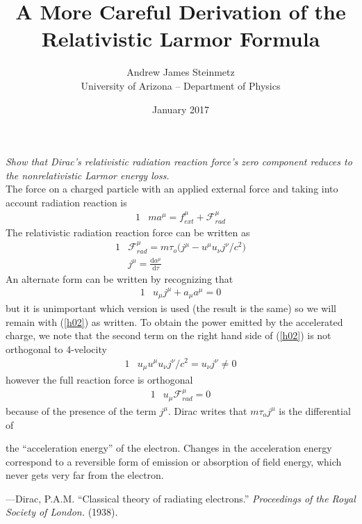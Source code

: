 \documentclass[]{article}
\numberwithin{equation}{subsection}
\begin{document}
\linespread{0.75}

\title{A More Careful Derivation of the Relativistic Larmor Formula}
\author{Andrew James Steinmetz\\ University of Arizona -- Department of Physics}
\date{January 2017}
\maketitle
\noindent \emph{Show that Dirac's relativistic radiation reaction force's zero component reduces to the nonrelativistic Larmor energy loss.}\\

\noindent The force on a charged particle with an applied external force and taking into account radiation reaction is
	\begin{alignat}{1}
	\label{h01}		&ma^{\mu}=f^{\mu}_{ext}+\mathcal{F}_{rad}^{\mu}
	\end{alignat}
The relativistic radiation reaction force can be written as
	\begin{alignat}{1}
	\label{h02}		&\mathcal{F}_{rad}^{\mu}=m\tau_{o}\Big(j^{\mu}-u^{\mu}u_{\nu}j^{\nu}/c^{2}\Big)\\
	\label{h03}		&j^{\mu}=\frac{\mathrm{d}a^{\mu}}{\mathrm{d}\tau}
	\end{alignat}
An alternate form can be written by recognizing that
	\begin{alignat}{1}
	\label{h04}		&u_{\mu}j^{\mu}+a_{\mu}a^{\mu}=0
	\end{alignat}
but it is unimportant which version is used (the result is the same) so we will remain with (\ref{h02}) as written. To obtain the power emitted by the accelerated charge, we note that the second term on the right hand side of (\ref{h02}) is not orthogonal to 4-velocity
	\begin{alignat}{1}
	\label{h05}		&u_{\mu}u^{\mu}u_{\nu}j^{\nu}/c^{2}=u_{\nu}j^{\nu}\neq0
	\end{alignat}
however the full reaction force is orthogonal
	\begin{alignat}{1}
	\label{h06}		&u_{\mu}\mathcal{F}_{rad}^{\mu}=0
	\end{alignat}
because of the presence of the term $j^{\mu}$. Dirac writes that $m\tau_{o}j^{\mu}$ is the differential of 
\begin{displayquote}
the ``acceleration energy'' of the electron. Changes in the acceleration energy correspond to a reversible form of emission or absorption of field energy, which never gets very far from the electron.
\end{displayquote}
\indent---Dirac, P.A.M. ``Classical theory of radiating electrons.'' \emph{Proceedings of the Royal Society of London.} (1938).\\
\end{document}
